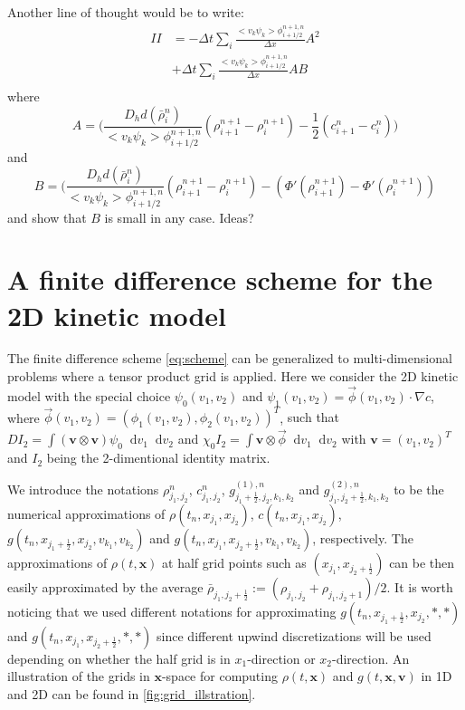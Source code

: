 \documentclass[review,onefignum,onetabnum]{siamart220329}
\newcommand {\bv} { {\mathbf{v}} }
\newcommand*\diff{\mathop{}\!\mathrm{d}}
\newcommand{\XR} {\color{red}}
\begin{document}
{Another line of thought would be to write:
\begin{equation*}
\begin{split}
II &=  -\Delta t \sum_i \frac{<v_k \psi_k>\phi_{i+1/2}^{n+1,n}}{\Delta x} A^2\\
& +\Delta t \sum_i \frac{<v_k \psi_k>\phi_{i+1/2}^{n+1,n}}{\Delta x} AB\\
\end{split}
\end{equation*}
where 
$$A = \bigg(\frac{D_h d(\bar{\rho}_i^n)}{<v_k \psi_k> \phi_{i+1/2}^{n+1,n}} (\rho_{i+1}^{n+1} - \rho_i^{n+1}) - \frac{1}{2} (c_{i+1}^{n} - c_i^n) \bigg)$$
and
$$
B = \bigg(\frac{D_h d(\bar{\rho}_i^n)}{<v_k \psi_k> \phi_{i+1/2}^{n+1,n}} (\rho_{i+1}^{n+1} - \rho_i^{n+1}) - (\Phi'(\rho_{i+1}^{n+1}) - \Phi'(\rho_i^{n+1}))
$$
and show that $B$ is small in any case. Ideas? 
}

\section{A finite difference scheme for the 2D kinetic model} \label{sec:appendix-FD-2D}
The finite difference scheme \cref{eq:scheme} can be generalized to multi-dimensional problems where a tensor product grid is applied. 
Here we consider the 2D kinetic model with the special choice $\psi_0(v_1,v_2)$ and $\psi_1(v_1, v_2) = \vec{\phi}(v_1,v_2) \cdot \nabla c$, where $\vec{\phi}(v_1,v_2) = (\phi_1(v_1,v_2), \phi_2(v_1,v_2))^T $, 
{\XR such that 
$D I_2 = \int (\bv\otimes \bv) \psi_0 \diff v_1 \diff v_2$ 
and
$\chi_0 I_2 = \int \bv\otimes \vec{\phi} \diff v_1 \diff v_2$ with $\bv=(v_1, v_2)^T$ and $I_2$ being the 2-dimentional identity matrix. 
}

We introduce the notations  $\rho_{j_1,j_2}^n$, $c_{j_1,j_2}^n$,  $g_{j_1+\frac12,j_2,k_1,k_2}^{(1), n}$ and $g_{j_1,j_2+\frac12,k_1,k_2}^{(2), n}$ to be the numerical approximations of $\rho(t_n,x_{j_1}, x_{j_2})$, $c(t_n,x_{j_1}, x_{j_2})$, $g(t_n, x_{j_1+\frac12}, x_{j_2}, v_{k_1}, v_{k_2})$ and 
$g(t_n, x_{j_1}, x_{j_2+\frac12}, v_{k_1}, v_{k_2})$, respectively. 
The approximations of $\rho(t, \mathbf{x})$ at half grid points such as $(x_{j_1}, x_{j_2+\frac12})$ can be then easily approximated by the average $\bar{\rho}_{j_1, j_2+\frac12} := (\rho_{j_1, j_2} + \rho_{j_1, j_2+1})/2$. 
It is worth noticing that we used different notations for approximating $g(t_n, x_{j_1+\frac12}, x_{j_2}, *, *)$ and $g(t_n, x_{j_1}, x_{j_2+\frac12}, *, *)$ since different upwind discretizations will be used depending on whether the half grid is in $x_1$-direction or $x_2$-direction. 
An illustration of the grids in $\mathbf{x}$-space for computing $\rho(t,\mathbf{x})$ and $g(t,\mathbf{x},\mathbf{v})$ in 1D and 2D can be found in \cref{fig:grid_illstration}. 
\end{document}
